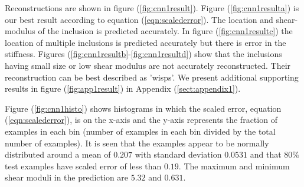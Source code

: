 \documentclass[12pt]{article}
\begin{document}
Reconstructions are shown in figure (\ref{fig:cnn1result}). Figure (\ref{fig:cnn1resulta}) is our best result according to equation (\ref{eqn:scalederror}). The location and shear-modulus of the inclusion is predicted accurately. In figure (\ref{fig:cnn1resultc}) the location of multiple inclusions is predicted accurately but there is error in the stiffness. Figures (\ref{fig:cnn1resultb}-\ref{fig:cnn1resultd}) show that the inclusions having small size or low shear modulus are not accurately reconstructed. Their reconstruction can be best described as 'wisps'. We present additional supporting results in figure (\ref{fig:app1result}) in Appendix (\ref{sect:appendix1}).

Figure (\ref{fig:cnn1histo}) shows histograms in which the scaled error, equation (\ref{eqn:scalederror}), is on the x-axis and the y-axis represents the fraction of examples in each bin (number of examples in each bin divided by the total number of examples). It is seen that the examples appear to be normally distributed around a mean of ${0.207}$ with standard deviation $0.0531$ and that $80\%$ test examples have scaled error of less than $0.19$. The maximum and minimum shear moduli in the prediction are $5.32$ and $0.631$. 
\end{document}
